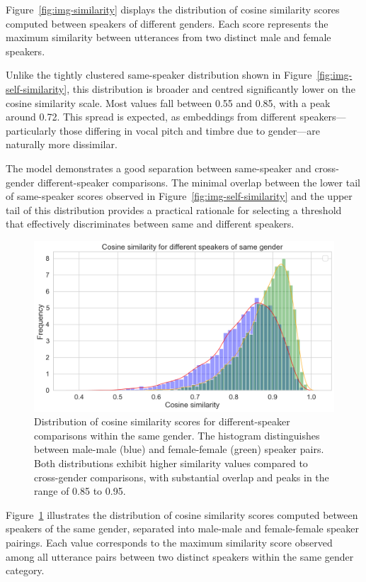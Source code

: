 \documentclass[conference]{IEEEtran}
\begin{document}
Figure~\ref{fig:img-similarity} displays the distribution of cosine similarity scores computed between speakers of different genders. Each score represents the maximum similarity between utterances from two distinct male and female speakers.

Unlike the tightly clustered same-speaker distribution shown in Figure~\ref{fig:img-self-similarity}, this distribution is broader and centred significantly lower on the cosine similarity scale. Most values fall between 0.55 and 0.85, with a peak around 0.72. This spread is expected, as embeddings from different speakers—particularly those differing in vocal pitch and timbre due to gender—are naturally more dissimilar.

The model demonstrates a good separation between same-speaker and cross-gender different-speaker comparisons. The minimal overlap between the lower tail of same-speaker scores observed in Figure~\ref{fig:img-self-similarity} and the upper tail of this distribution provides a practical rationale for selecting a threshold that effectively discriminates between same and different speakers.

\begin{figure}[H]
	\centering
	\includegraphics[width=0.7\linewidth]{img/img-similarity-same-gender}
	\caption{Distribution of cosine similarity scores for different-speaker comparisons within the same gender. The histogram distinguishes between male-male (blue) and female-female (green) speaker pairs. Both distributions exhibit higher similarity values compared to cross-gender comparisons, with substantial overlap and peaks in the range of 0.85 to 0.95.}	
	\label{fig:img-similarity-same-gender}
\end{figure}

Figure~\ref{fig:img-similarity-same-gender} illustrates the distribution of cosine similarity scores computed between speakers of the same gender, separated into male-male and female-female speaker pairings. Each value corresponds to the maximum similarity score observed among all utterance pairs between two distinct speakers within the same gender category.
\end{document}
